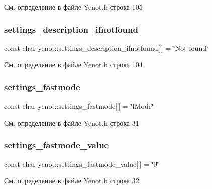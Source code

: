 См. определение в файле Yenot.\+h строка 105

\mbox{\label{namespaceyenot_a53b4bd62fd7a6e3abedfdfb47db53284}} 
\subsubsection{\texorpdfstring{settings\+\_\+description\+\_\+ifnotfound}{settings\_description\_ifnotfound}}
{\footnotesize\ttfamily const char yenot\+::settings\+\_\+description\+\_\+ifnotfound\mbox{[}$\,$\mbox{]} = \char`\"{}Not found\char`\"{}}



См. определение в файле Yenot.\+h строка 104

\mbox{\label{namespaceyenot_a49273bc3609e4a1d9c1a3e4a5cfcdafd}} 
\subsubsection{\texorpdfstring{settings\+\_\+fastmode}{settings\_fastmode}}
{\footnotesize\ttfamily const char yenot\+::settings\+\_\+fastmode\mbox{[}$\,$\mbox{]} = \char`\"{}f\+Mode\char`\"{}}



См. определение в файле Yenot.\+h строка 31

\mbox{\label{namespaceyenot_a860366d2b9aa9cf0d9cdcaf58528c101}} 
\subsubsection{\texorpdfstring{settings\+\_\+fastmode\+\_\+value}{settings\_fastmode\_value}}
{\footnotesize\ttfamily const char yenot\+::settings\+\_\+fastmode\+\_\+value\mbox{[}$\,$\mbox{]} = \char`\"{}0\char`\"{}}



См. определение в файле Yenot.\+h строка 32

